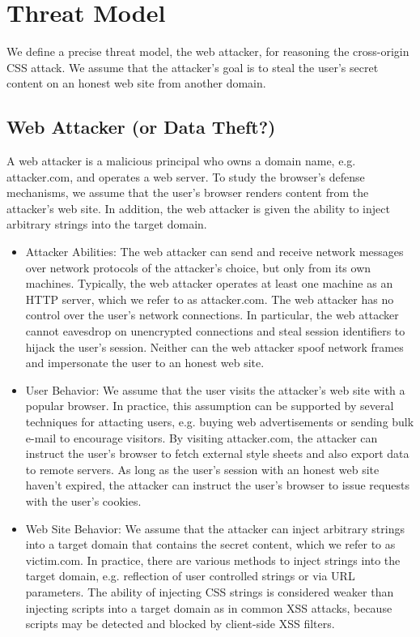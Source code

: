 \documentclass{acm_proc_article-sp}
\begin{document}
\section{Threat Model}
We define a precise threat model, the web attacker, for reasoning the cross-origin CSS attack. We assume that the attacker's goal is to steal the user's secret content on an honest web site from another domain.

\subsection*{Web Attacker (or Data Theft?)}
A web attacker is a malicious principal who owns a domain name, e.g. attacker.com, and operates a web server. To study the browser's defense mechanisms, we assume that the user's browser renders content from the attacker's web site. In addition, the web attacker is given the ability to inject arbitrary strings into the target domain.

\begin{itemize}

\item{Attacker Abilities:}
The web attacker can send and receive network messages over network protocols of the attacker's choice, but only from its own machines. Typically, the web attacker operates at least one machine as an HTTP server, which we refer to as attacker.com. The web attacker has no control over the user's network connections. In particular, the web attacker cannot eavesdrop on unencrypted connections and steal session identifiers to hijack the user's session. Neither can the web attacker spoof network frames and impersonate the user to an honest web site.

\item{User Behavior:}
We assume that the user visits the attacker's web site with a popular browser. In practice, this assumption can be supported by several techniques for attacting users, e.g. buying web advertisements or sending bulk e-mail to encourage visitors. By visiting attacker.com, the attacker can instruct the user's browser to fetch external style sheets and also export data to remote servers. As long as the user's session with an honest web site haven't expired, the attacker can instruct the user's browser to issue requests with the user's cookies.

\item{Web Site Behavior:}
We assume that the attacker can inject arbitrary strings into a target domain that contains the secret content, which we refer to as victim.com. In practice, there are various methods to inject strings into the target domain, e.g. reflection of user controlled strings or via URL parameters. The ability of injecting CSS strings is considered weaker than injecting scripts into a target domain as in common XSS attacks, because scripts may be detected and blocked by client-side XSS filters.

\end{itemize}
\end{document}
